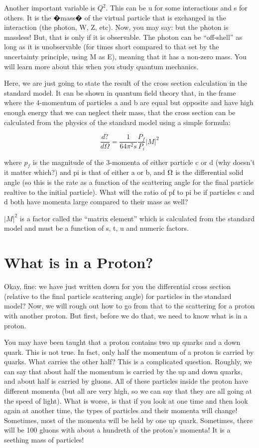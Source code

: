 Another important variable is \(Q^{2}\).  This can be u for some interactions and s for others.  It is the �mass� of the virtual particle that is exchanged in the interaction (the photon, W, Z, etc).  
Now, you may say: but the photon is massless!  But, that is only if it is observable.  The photon can be ``off-shell'' as long as it is unobservable (for times short compared to that set by the uncertainty principle, using M as E), meaning that it has a non-zero mass.  You will learn more about this when you study quantum mechanics.

Here, we are just going to state the result of the cross section calculation in the standard model.
It can be shown in quantum field theory that, in the frame where the 4-momentum of particles a and b are equal but opposite and have high enough energy that we can neglect their mass, that the cross section can be calculated from the physics of the standard model using a simple formula:

\begin{equation}
\frac{d?}{d\Omega} = \frac{1}{64\pi^{2}s}\frac{P_{f}}{P_{i}}|M|^{2}
\end{equation}

where \(p_{f}\) is the magnitude of the 3-momenta of either particle c or d (why doesn't it matter which?) and pi is that of either a or b, and ${\rm \Omega}$ is the differential solid angle (so this is the rate as a function of the scattering angle for the final particle realtive to the initial particle). 
What will the ratio of pf to pi be if particles c and d both have momenta large compared to their mass as well?

\(|M|^{2}\)  is a factor called the ``matrix element'' which is calculated from the standard model and must be a function of s, t, u and numeric factors.



\section{What is in a Proton?}
Okay, fine: we have just written down for you the differential cross section (relative to the final particle scattering angle) for particles in the standard model?  Now, we will rough out how to go from that to the scattering for a proton with another proton.  But first, before we do that, we need to know what is in a proton.


You may have been taught that a proton contains two up quarks and a down quark.  This is not true.  In fact, only half the momentum of a proton is carried by quarks.  What carries the other half?  This is a complicated question. Roughly, we can say that about half the momentum is carried by the up and down quarks, and about half is carried by gluons.  All of these particles inside the proton have different momenta (but all are very high, so we can say that they are all going at the speed of light). What is worse, is that if you look at one time and then look again at another time, the types of particles and their momenta will change!  Sometimes, most of the momenta will be held by one up quark. Sometimes, there will be 100 gluons with about a hundreth of the proton's momenta! It is a seething mass of particles!


